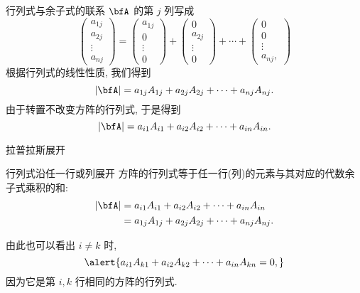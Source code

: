 \begin{frame}{行列式与余子式的联系}
	\onslide<+->
	$\bfA$ 的第 $j$ 列写成
	\[\begin{pmatrix}
		a_{1j}\\a_{2j}\\\vdots\\a_{nj}
	\end{pmatrix}
	=\begin{pmatrix}
		a_{1j}\\0\\\vdots\\0
	\end{pmatrix}
	+\begin{pmatrix}
		0\\a_{2j}\\\vdots\\0
	\end{pmatrix}+\cdots+\begin{pmatrix}
		0\\0\\\vdots\\a_{nj},
	\end{pmatrix}\]
	\onslide<+->
	根据行列式的线性性质, 我们得到
	\[|\bfA|=a_{1j}A_{1j}+a_{2j}A_{2j}+\cdots+a_{nj}A_{nj}.\]
	\onslide<+->
	由于转置不改变方阵的行列式, 于是得到
	\[|\bfA|=a_{i1}A_{i1}+a_{i2}A_{i2}+\cdots+a_{in}A_{in}.\]
\end{frame}


\begin{frame}{拉普拉斯展开}
	\onslide<+->
	\begin{second}{行列式沿任一行或列展开}
		方阵的行列式等于任一行(列)的元素与其对应的代数余子式乘积的和:
		\begin{align*}
			|\bfA|&=a_{i1}A_{i1}+a_{i2}A_{i2}+\cdots+a_{in}A_{in}\\
			&=a_{1j}A_{1j}+a_{2j}A_{2j}+\cdots+a_{nj}A_{nj}.
		\end{align*}
	\end{second}
	\onslide<+->
	由此也可以看出 \alert{$i\neq k$ 时,}
	\[\alert{a_{i1}A_{k1}+a_{i2}A_{k2}+\cdots+a_{in}A_{kn}=0,}\]
	\onslide<+->
	因为它是第 $i,k$ 行相同的方阵的行列式.
\end{frame}


